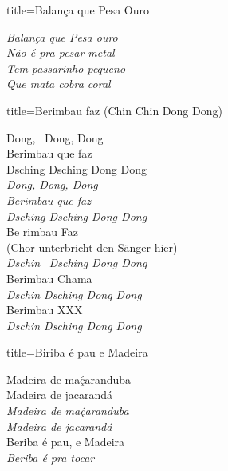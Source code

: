 \documentclass[fontsize=14pt, paper=a4, twoside, DIV=20]{scrreprt} %
\begin{document}
\begin{multicols*}{2}
\begin{song}{title={Balança que Pesa Ouro}}
\begin{verse*}
        \textit{Balança que Pesa ouro \\ 
        Não é pra pesar metal \\ 
        Tem passarinho pequeno \\ 
        Que mata cobra coral} \\
        \end{verse*}
\end{song}

\columnbreak
\begin{song}{title={Berimbau faz (Chin Chin Dong Dong)}}
        \begin{verse*}
            Dong, \ Dong, Dong\\
            Berimbau que faz\\
            Dsching Dsching Dong Dong\\
            \textit{Dong, Dong, Dong\\
            Berimbau que faz\\
            Dsching Dsching Dong Dong}\\
            Be rimbau Faz \\
            (Chor unterbricht den Sänger hier)\\
            \textit{Dschin} \ \textit{Dsching Dong Dong}\\
            Berimbau Chama\\
            \textit{Dschin Dsching Dong Dong}\\
            Berimbau XXX\\
            \textit{Dschin Dsching Dong Dong}\\
        \end{verse*}
\end{song}

 \begin{song}{title={Biriba é pau e Madeira}}
         \begin{verse*}
             Madeira de maḉaranduba\\
             Madeira de jacarandá\\
             \textit{Madeira de maḉaranduba}\\
             \textit{Madeira de jacarandá}\\
             Beriba é pau, e Madeira\\
             \textit{Beriba é pra tocar}\\
         \end{verse*}
 \end{song}
 

\end{multicols*}
\end{document}
